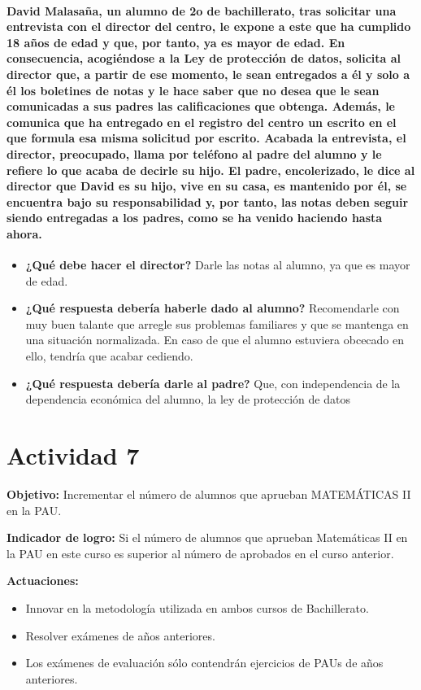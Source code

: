 \paragraph{David Malasaña, un alumno de 2o de bachillerato, tras solicitar una entrevista con el
director del centro, le expone a este que ha cumplido 18 años de edad y que, por
tanto, ya es mayor de edad. En consecuencia, acogiéndose a la Ley de protección de
datos, solicita al director que, a partir de ese momento, le sean entregados a él y solo
a él los boletines de notas y le hace saber que no desea que le sean comunicadas a sus
padres las calificaciones que obtenga. Además, le comunica que ha entregado en el
registro del centro un escrito en el que formula esa misma solicitud por escrito.
Acabada la entrevista, el director, preocupado, llama por teléfono al padre del alumno
y le refiere lo que acaba de decirle su hijo. El padre, encolerizado, le dice al director
que David es su hijo, vive en su casa, es mantenido por él, se encuentra bajo su
responsabilidad y, por tanto, las notas deben seguir siendo entregadas a los padres,
como se ha venido haciendo hasta ahora.}

\begin{itemize}
\item \textbf{¿Qué debe hacer el director?}
\subitem Darle las notas al alumno, ya que es mayor de edad.
\item \textbf{¿Qué respuesta debería haberle dado al alumno?}
\subitem Recomendarle con muy buen talante que arregle sus problemas familiares y que se mantenga en una situación normalizada.
%
En caso de que el alumno estuviera obcecado en ello, tendría que acabar cediendo.
\item \textbf{¿Qué respuesta debería darle al padre?}
\subitem Que, con independencia de la dependencia económica del alumno, la ley de protección de datos
\end{itemize}


\section{Actividad 7}

\textbf{Objetivo:}
Incrementar el número de alumnos que aprueban MATEMÁTICAS II en la PAU.

\textbf{Indicador de logro:}
Si el número de alumnos que aprueban Matemáticas II en la PAU en este curso es superior al número de aprobados en el curso anterior.

\textbf{Actuaciones:}
\vspace{-1cm}
\begin{itemize}
	\item Innovar en la metodología utilizada en ambos cursos de Bachillerato.
	\item Resolver exámenes de años anteriores.
	\item Los exámenes de evaluación sólo contendrán ejercicios de PAUs de años anteriores.
\end{itemize}

